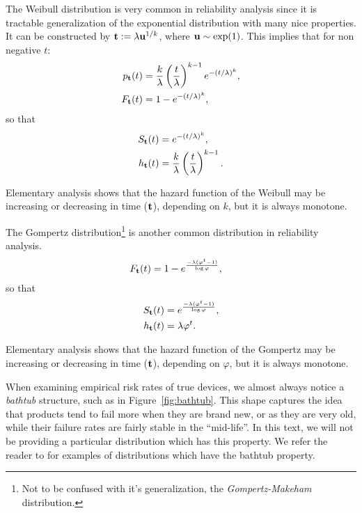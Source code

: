 \begin{example}
The Weibull distribution is very common in reliability analysis since it is tractable generalization of the exponential distribution with many nice properties. 
It can be constructed by 
$\mathbf{t} := \lambda \mathbf{u}^{1/k}$, where $\mathbf{u} \sim \exp(1)$. 
This implies that for non negative $t$:
\begin{align}
	p_{\mathbf{t}} (t) &= \frac{k}{\lambda}\left(\frac{t}{\lambda} \right)^{k-1} e^{-(t/\lambda)^k}, \\
	F_{\mathbf{t}} (t) &= 1 - e^{-(t/\lambda)^k},
\end{align}
so that 
\begin{align}
	S_{\mathbf{t}} (t) &= e^ {-(t/\lambda )^k}, \\
	h_{\mathbf{t}} (t) &= \frac{k}{\lambda} \left(\frac{t}{\lambda} \right)^{k-1} .
\end{align}
\end{example}
Elementary analysis shows that the hazard function of the Weibull may be increasing or decreasing in time ($\mathbf{t}$), depending on $k$, but it is always monotone.




\begin{example}
	The Gompertz distribution\footnote{Not to be confused with it's generalization, the \emph{Gompertz-Makeham} distribution.} is another common distribution in reliability analysis. 
	\begin{align}
	F_{\mathbf{t}} (t) &= 1- e^\frac{-\lambda (\varphi^t-1)}{\log \varphi},
	\end{align}
	so that 
	\begin{align}
	S_{\mathbf{t}} (t) &= e^\frac{-\lambda (\varphi^t-1)}{\log \varphi}, \\
	h_{\mathbf{t}} (t) &= \lambda \varphi^t .
	\end{align}
\end{example}
Elementary analysis shows that the hazard function of the Gompertz may be increasing or decreasing in time ($\mathbf{t}$), depending on $\varphi$, but it is always monotone.





\begin{example}
	\label{ex:bathtub}
When examining empirical risk rates of true devices, we almost always notice a \emph{bathtub} structure, such as in Figure~\ref{fig:bathtub}.
This shape captures the idea that products tend to fail more when they are brand new, or as they are very old, while their failure rates are fairly stable in the ``mid-life''.
In this text, we will not be providing a particular distribution which has this property. 
We refer the reader to \cite{nadarajah_bathtub-shaped_2008} for examples of distributions which have the bathtub property.
\end{example}


